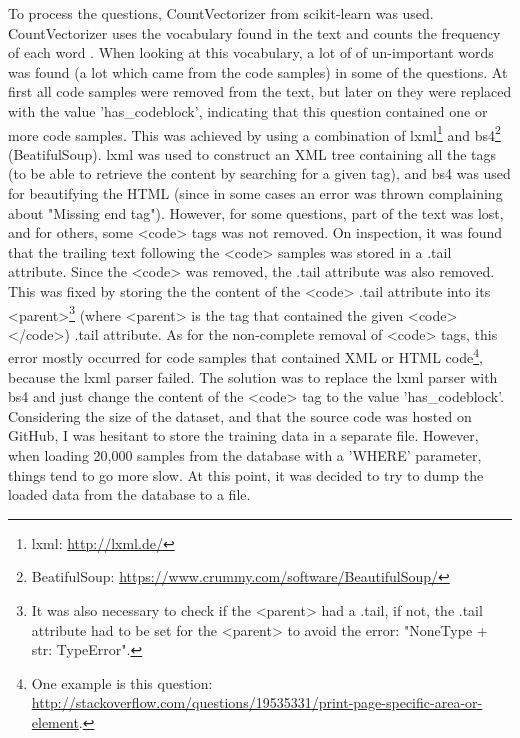 \noindent
To process the questions, CountVectorizer from scikit-learn was used. 
CountVectorizer uses the vocabulary found in the text and counts the frequency of each word \cite{Scikitlearn.org2016b} \cite[4.2.3]{Scikitlearn.org2016}. 
When looking at this vocabulary, a lot of of un-important words was found (a lot which came from the code samples) in some of the questions. 
At first all code samples were removed from the text, but later on they were replaced with the value 'has\_codeblock', indicating that this question contained one or more code samples. 
This was achieved by using a combination of lxml\footnote{lxml: \url{http://lxml.de/}} and bs4\footnote{BeatifulSoup: \url{https://www.crummy.com/software/BeautifulSoup/}} (BeatifulSoup). 
lxml was used to construct an XML tree containing all the tags (to be able to retrieve the content by searching for a given tag), and bs4 was used for beautifying the HTML 
(since in some cases an error was thrown complaining about "Missing end tag").
\vspace{0.5em}\newline
However, for some questions, part of the text was lost, and for others, some <code> tags was not removed. 
On inspection, it was found that the trailing text following the <code> samples was stored in a .tail attribute. 
Since the <code> was removed, the .tail attribute was also removed. 
This was fixed by storing the the content of the <code> .tail attribute into its <parent>\footnote{
	It was also necessary to check if the <parent> had a .tail, if not, the .tail attribute had to be set for the <parent> to avoid the error: 
	"NoneType + str: TypeError".
	} 
(where <parent> is the tag that contained the given <code></code>) .tail attribute. 
As for the non-complete removal of <code> tags, this error mostly occurred for code samples that contained XML or HTML code\footnote{
	One example is this question: \\
	\url{http://stackoverflow.com/questions/19535331/print-page-specific-area-or-element}.
	}, 
because the lxml parser failed. 
The solution was to replace the lxml parser with bs4 and just change the content of the <code> tag to the value 'has\_codeblock'.
\vspace{0.5em}\newline
Considering the size of the dataset, and that the source code was hosted on GitHub, I was hesitant to store the training data in a separate file. 
However, when loading 20,000 samples from the database with a 'WHERE' parameter, things tend to go more slow. 
At this point, it was decided to try to dump the loaded data from the database to a file. 
